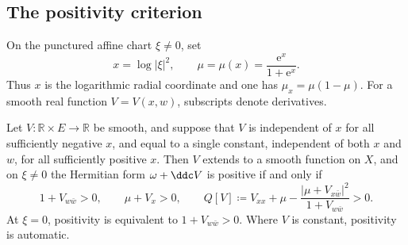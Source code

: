 \documentclass[11pt,a4paper]{article}
\begin{document}
	\subsection{The positivity criterion}

	On the punctured affine chart $\xi\ne0$, set
	\[
		x=\log|\xi|^2,
		\qquad
		\mu=\mu(x)=\frac{\mathrm{e}^x}{1+\mathrm{e}^x}.
	\]
	Thus $x$ is the logarithmic radial coordinate and one has $\mu_x=\mu(1-\mu)$.
	For a smooth real function $V=V(x,w)$, subscripts denote derivatives.
	\begin{lemma}\label{lem:positivity}
		Let $V\colon\mathbb R\times E\to\mathbb R$ be smooth, and suppose
		that $V$ is independent of $x$ for all sufficiently negative $x$,
		and equal to a single constant, independent of both $x$ and $w$,
		for all sufficiently positive $x$.  Then $V$ extends to a smooth
		function on $X$, and on
		$\xi\ne0$ the Hermitian form
		$\omega+\ddc V$ is positive if and only if
		\begin{equation}\label{eq:three-minors}
			1+V_{w\bar w}>0,
			\qquad
			\mu+V_x>0,
			\qquad
			Q[V]\coloneqq V_{xx}+\mu-
			\frac{|\mu+V_{x\bar w}|^2}{1+V_{w\bar w}}>0.
		\end{equation}
		At $\xi=0$, positivity is equivalent to $1+V_{w\bar w}>0$.
		Where $V$ is constant, positivity is automatic.
	\end{lemma}
	
\end{document}
